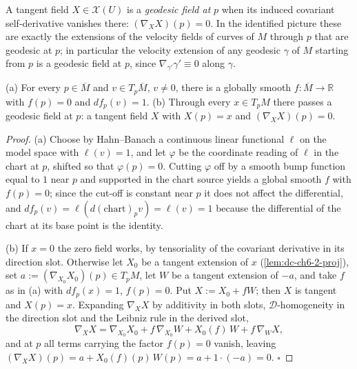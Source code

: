 \begin{definition}
  \label{def:dc-ch6-2-9-geodesic-field}
  \leanok
  A tangent field $X\in\mathcal{X}(U)$ is a \emph{geodesic field at} $p$ when its
  induced covariant self-derivative vanishes there: $(\nabla_X X)(p)=0$. In the
  identified picture these are exactly the extensions of the velocity fields of
  curves of $M$ through $p$ that are geodesic at $p$; in particular the velocity
  extension of any geodesic $\gamma$ of $M$ starting from $p$ is a geodesic field
  at $p$, since $\nabla_{\gamma'}\gamma'\equiv0$ along $\gamma$.
\end{definition}

\begin{lemma}
  \label{lem:dc-ch6-2-9-existence}
  \leanok
  (a) For every $p\in\overline{M}$ and $v\in T_p\overline{M}$, $v\neq0$, there is a
  globally smooth $f:\overline{M}\to\mathbb{R}$ with $f(p)=0$ and $df_p(v)=1$.
  (b) Through every $x\in T_pM$ there passes a geodesic field at $p$: a tangent
  field $X$ with $X(p)=x$ and $(\nabla_X X)(p)=0$.
\end{lemma}
\begin{proof}
  \leanok
  (a) Choose by Hahn--Banach a continuous linear functional $\ell$ on the model
  space with $\ell(v)=1$, and let $\varphi$ be the coordinate reading of $\ell$
  in the chart at $p$, shifted so that $\varphi(p)=0$. Cutting $\varphi$ off by
  a smooth bump function equal to $1$ near $p$ and supported in the chart source
  yields a global smooth $f$ with $f(p)=0$; since the cut-off is constant near
  $p$ it does not affect the differential, and $df_p(v)=\ell(d(\mathrm{chart})_p
  v)=\ell(v)=1$ because the differential of the chart at its base point is the
  identity.

  (b) If $x=0$ the zero field works, by tensoriality of the covariant derivative
  in its direction slot. Otherwise let $X_0$ be a tangent extension of $x$
  (\cref{lem:dc-ch6-2-proj}), set $a:=(\nabla_{X_0}X_0)(p)\in T_pM$, let $W$ be a
  tangent extension of $-a$, and take $f$ as in (a) with $df_p(x)=1$, $f(p)=0$.
  Put $X:=X_0+fW$; then $X$ is tangent and $X(p)=x$. Expanding
  $\nabla_{X}X$ by additivity in both slots, $\mathcal{D}$-homogeneity in the
  direction slot and the Leibniz rule in the derived slot,
  $$
  \nabla_X X=\nabla_{X_0}X_0+f\,\nabla_{X_0}W+X_0(f)\,W+f\,\nabla_{W}X ,
  $$
  and at $p$ all terms carrying the factor $f(p)=0$ vanish, leaving
  $(\nabla_XX)(p)=a+X_0(f)(p)\,W(p)=a+1\cdot(-a)=0$. $\square$
\end{proof}

